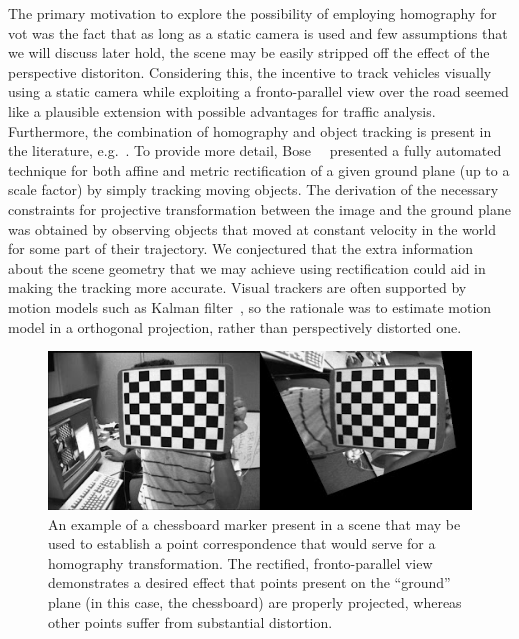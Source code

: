 The primary motivation to explore the possibility of employing homography for \gls{vot} was the fact that as long as a static camera is used and few assumptions that we will discuss later hold, the scene may be easily stripped off the effect of the perspective distoriton. Considering this, the incentive to track vehicles visually using a static camera while exploiting a fronto-parallel view over the road seemed like a plausible extension with possible advantages for traffic analysis. Furthermore, the combination of homography and object tracking is present in the literature, e.g.~\cite{bose2004groundplane, zhang2012homographytrack, Mei2009}. To provide more detail, Bose~\etal{}~\cite{bose2004groundplane} presented a fully automated technique for both affine and metric rectification of a given ground plane (up to a scale factor) by simply tracking moving objects. The derivation of the necessary constraints for projective transformation between the image and the ground plane was obtained by observing objects that moved at constant velocity in the world for some part of their trajectory. We conjectured that the extra information about the scene geometry that we may achieve using rectification could aid in making the tracking more accurate. Visual trackers are often supported by motion models such as Kalman filter~\cite{kalman1960linearfilter}, so the rationale was to estimate motion model in a orthogonal projection, rather than perspectively distorted one.

\begin{figure}[t]
    \centerline{\includegraphics[width=\linewidth]{figures/homography/chessboard_marker.jpg}}
    \caption[Chessboard marker]{An example of a chessboard marker present in a scene that may be used to establish a point correspondence that would serve for a homography transformation. The rectified, fronto-parallel view demonstrates a desired effect that points present on the ``ground'' plane (in this case, the chessboard) are properly projected, whereas other points suffer from substantial distortion. }
    \label{fig:ChessboardMarker}
\end{figure}

